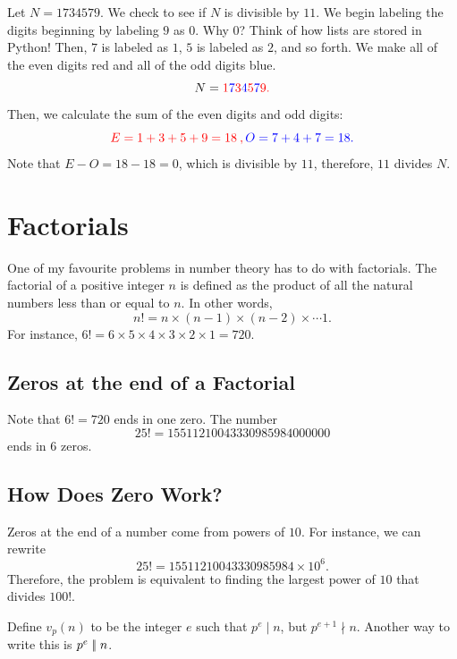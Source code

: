 Let $N=1734579.$ We check to see if $N$ is divisible by $11$. We begin labeling the digits beginning by labeling $9$ as $0$. Why $0$? Think of how lists are stored in Python! Then, $7$ is labeled as $1$, $5$ is labeled as $2$, and so forth. We make all of the \color{red} even \color{black} digits red and all of the \color{blue} odd \color{black} digits blue.
$$N=\color{red}1\color{blue}7\color{red}3\color{blue}4\color{red}5\color{blue}7\color{red}9.$$ Then, we calculate the sum of the even digits and odd digits: $$\color{red} E=1+3+5+9=18\:, \color{blue}O=7+4+7=18.$$ Note that $E-O=18-18=0$, which is divisible by $11$, therefore, $11$ divides $N$.  

\section{Factorials}

One of my favourite problems in number theory has to do with factorials. The factorial of a positive integer $n$ is defined as the product of all the natural numbers less than or equal to $n$. In other words, $$n!=n\times (n-1)\times (n-2)\times \cdots 1.$$  For instance, $6!=6\times 5\times 4\times 3\times 2\times 1=720$.

\subsection{Zeros at the end of a Factorial}

Note that $6!=720$ ends in one zero.  The number $$25!=15511210043330985984000000$$ ends in $6$ zeros. 

\clearpage 

\subsection*{How Does Zero Work?}

Zeros at the end of a number come from powers of $10$.  For instance, we can rewrite $$25!=15511210043330985984\times 10^6.$$  
Therefore, the problem is equivalent to finding the largest power of $10$ that divides $100!$.  \begin{defi}  Define $v_p(n)$ to be the integer $e$ such that $p^e\mid n$, but $p^{e+1}\nmid n$. Another way to write this is $p^e\mid\!\mid n$. \end{defi} 

